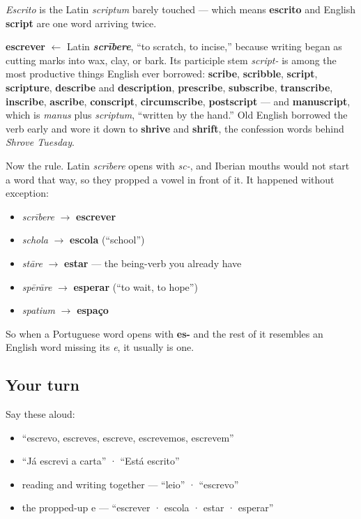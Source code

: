\emph{Escrito} is the Latin \emph{scriptum} barely touched — which means \textbf{escrito} and English \textbf{script} are one word arriving twice.

\begin{cousinweb}
\textbf{escrever} $\leftarrow$ Latin \emph{\textbf{scrībere}}, \textquotedblleft{}to scratch, to incise,\textquotedblright{} because writing began as cutting marks into wax, clay, or bark. Its participle stem \emph{script-} is among the most productive things English ever borrowed: \textbf{scribe}, \textbf{scribble}, \textbf{script}, \textbf{scripture}, \textbf{describe} and \textbf{description}, \textbf{prescribe}, \textbf{subscribe}, \textbf{transcribe}, \textbf{inscribe}, \textbf{ascribe}, \textbf{conscript}, \textbf{circumscribe}, \textbf{postscript} — and \textbf{manuscript}, which is \emph{manus} plus \emph{scriptum}, \textquotedblleft{}written by the hand.\textquotedblright{} Old English borrowed the verb early and wore it down to \textbf{shrive} and \textbf{shrift}, the confession words behind \emph{Shrove Tuesday}.

Now the rule. Latin \emph{scrībere} opens with \emph{sc-}, and Iberian mouths would not start a word that way, so they propped a vowel in front of it. It happened without exception:

\begin{itemize}
\raggedright
  \item \emph{scrībere} $\to$ \textbf{escrever}
  \item \emph{schola} $\to$ \textbf{escola} (\textquotedblleft{}school\textquotedblright{})
  \item \emph{stāre} $\to$ \textbf{estar} — the being-verb you already have
  \item \emph{spērāre} $\to$ \textbf{esperar} (\textquotedblleft{}to wait, to hope\textquotedblright{})
  \item \emph{spatium} $\to$ \textbf{espaço}
\end{itemize}

So when a Portuguese word opens with \textbf{es-} and the rest of it resembles an English word missing its \emph{e}, it usually is one.
\end{cousinweb}

\subsection*{Your turn}
Say these aloud:

\begin{itemize}
\raggedright
  \item \textquotedblleft{}escrevo, escreves, escreve, escrevemos, escrevem\textquotedblright{}
  \item \textquotedblleft{}Já escrevi a carta\textquotedblright{} · \textquotedblleft{}Está escrito\textquotedblright{}
  \item reading and writing together — \textquotedblleft{}leio\textquotedblright{} · \textquotedblleft{}escrevo\textquotedblright{}
  \item the propped-up e — \textquotedblleft{}escrever · escola · estar · esperar\textquotedblright{}
\end{itemize}

